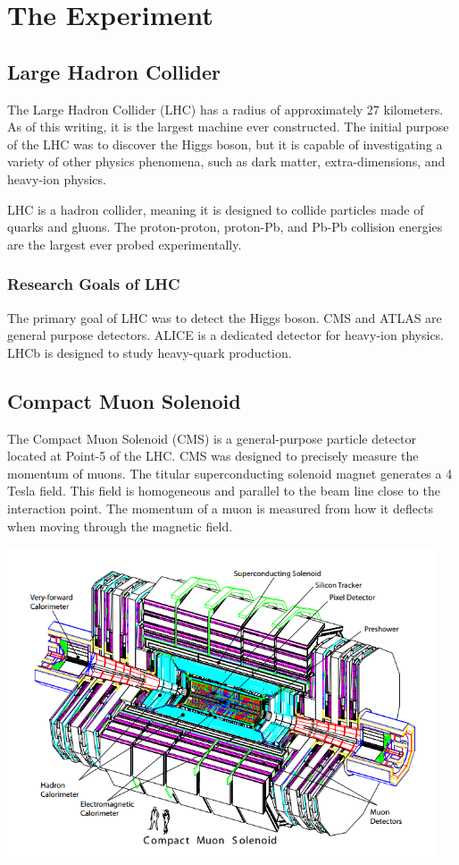 
\chapter{The Experiment}

\section{Large Hadron Collider}

The Large Hadron Collider (LHC) has a radius of approximately 27 kilometers. As of this writing, it is the largest machine ever constructed. The initial purpose of the LHC was to discover the Higgs boson, but it is capable of investigating a variety of other physics phenomena, such as dark matter, extra-dimensions, and heavy-ion physics. 

LHC is a hadron collider, meaning it is designed to collide particles made of quarks and gluons. The proton-proton, proton-Pb, and Pb-Pb collision energies are the largest ever probed experimentally.

\subsection{Research Goals of LHC}

The primary goal of LHC was to detect the Higgs boson. CMS and ATLAS are general purpose detectors. ALICE is a dedicated detector for heavy-ion physics. LHCb is designed to study heavy-quark production. 

\section{Compact Muon Solenoid}

The Compact Muon Solenoid (CMS) is a general-purpose particle detector located at Point-5 of the LHC. CMS was designed to precisely measure the momentum of muons. The titular superconducting solenoid magnet generates a 4 Tesla field. This field is homogeneous and parallel to the beam line close to the interaction point. The momentum of a muon is measured from how it deflects when moving through the magnetic field. 

\centerline{
\includegraphics[width=5in]{Chapter3/importfigs/fromCMS_DesignPaper_perspective.png}
}

